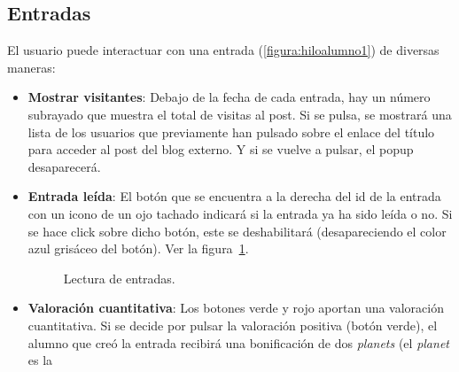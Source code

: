 \documentclass[a4paper, 12pt]{book}
\begin{document}
\subsection{Entradas}
El usuario puede interactuar con una entrada (\ref{figura:hiloalumno1}) de diversas maneras:
\begin{itemize}
  \item {\bfseries Mostrar visitantes}: Debajo de la fecha de cada entrada, hay un n\'umero subrayado que muestra el total de visitas al post. Si se pulsa, 
  se mostrar\'a una lista de los usuarios que previamente han pulsado sobre el enlace del t\'itulo para acceder al post del blog externo. Y si se vuelve a 
  pulsar, el popup desaparecer\'a.
  \item {\bfseries Entrada le\'ida}: El bot\'on que se encuentra a la derecha del id de la entrada con un icono de un ojo tachado indicar\'a si la entrada 
  ya ha sido le\'ida o no. Si se hace click sobre dicho bot\'on, este se deshabilitar\'a (desapareciendo el color azul gris\'aceo del bot\'on). Ver la 
  figura~\ref{fig:LecturaEntradaLeidayNoLeida}.
  \begin{figure}[htbp] 
    \centering
    \caption{Lectura de entradas.}
    \label{fig:LecturaEntradaLeidayNoLeida}
  \end{figure}
  \item {\bfseries Valoraci\'on cuantitativa}: Los botones verde y rojo aportan una valoraci\'on cuantitativa. Si se decide por pulsar 
  la valoraci\'on positiva (bot\'on verde), el alumno que cre\'o la entrada recibir\'a una bonificaci\'on de dos \textit{planets} (el \textit{planet} es la 

\end{itemize}
\end{document}
